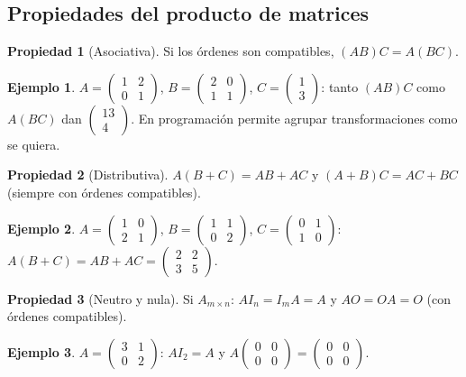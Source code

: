 \documentclass[a4paper,12pt]{article}
\theoremstyle{definition}
\newtheorem{ejemplo}{Ejemplo}[section]
\newtheorem{propiedad}{Propiedad}[section]
\begin{document}
\subsection{Propiedades del producto de matrices}
\begin{propiedad}[Asociativa]
Si los \'ordenes son compatibles, $(AB)C = A(BC)$.
\end{propiedad}
\begin{ejemplo}
$A=\begin{pmatrix} 1 & 2 \\ 0 & 1 \end{pmatrix}$, $B=\begin{pmatrix} 2 & 0 \\ 1 & 1 \end{pmatrix}$, $C=\begin{pmatrix} 1 \\ 3 \end{pmatrix}$: tanto $(AB)C$ como $A(BC)$ dan $\begin{pmatrix} 13 \\ 4 \end{pmatrix}$. En programaci\'on permite agrupar transformaciones como se quiera.
\end{ejemplo}

\begin{propiedad}[Distributiva]
$A(B+C) = AB+AC$ y $(A+B)C = AC+BC$ (siempre con \'ordenes compatibles).
\end{propiedad}
\begin{ejemplo}
$A=\begin{pmatrix} 1 & 0 \\ 2 & 1 \end{pmatrix}$, $B=\begin{pmatrix} 1 & 1 \\ 0 & 2 \end{pmatrix}$, $C=\begin{pmatrix} 0 & 1 \\ 1 & 0 \end{pmatrix}$: $A(B+C)=AB+AC=\begin{pmatrix} 2 & 2 \\ 3 & 5 \end{pmatrix}$.
\end{ejemplo}

\begin{propiedad}[Neutro y nula]
Si $A_{m \times n}$: $A I_n = I_m A = A$ y $A O = O A = O$ (con \'ordenes compatibles).
\end{propiedad}
\begin{ejemplo}
$A=\begin{pmatrix} 3 & 1 \\ 0 & 2 \end{pmatrix}$: $A I_2 = A$ y $A \begin{pmatrix} 0 & 0 \\ 0 & 0 \end{pmatrix} = \begin{pmatrix} 0 & 0 \\ 0 & 0 \end{pmatrix}$.
\end{ejemplo}
\end{document}
